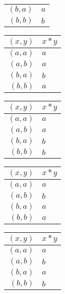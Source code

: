 \begin{enumerate}[label={\Alph*.},font={\bfseries}]
\begin{enumerate}[label={\arabic*},font={\bfseries}]
\begin{minipage}[h]{.25\textwidth}
\begin{tabular}{ r | l }
        $(b,a)$ & $a$ \\
        $(b,b)$ & $b$
      \end{tabular}
    \end{minipage}
    \begin{minipage}[h]{.25\textwidth}
      \begin{tabular}{ r | l }
        $(x,y)$ & $x*y$ \\
        \hline
        $(a,a)$ & $a$ \\
        $(a,b)$ & $a$ \\
        $(b,a)$ & $b$ \\
        $(b,b)$ & $a$
      \end{tabular}
    \end{minipage}
    \begin{minipage}[h]{.25\textwidth}
      \begin{tabular}{ r | l }
        $(x,y)$ & $x*y$ \\
        \hline
        $(a,a)$ & $a$ \\
        $(a,b)$ & $a$ \\
        $(b,a)$ & $b$ \\
        $(b,b)$ & $b$
      \end{tabular}
    \end{minipage}
    \begin{minipage}[h]{.25\textwidth}
      \begin{tabular}{ r | l }
        $(x,y)$ & $x*y$ \\
        \hline
        $(a,a)$ & $a$ \\
        $(a,b)$ & $b$ \\
        $(b,a)$ & $a$ \\
        $(b,b)$ & $a$
      \end{tabular}
    \end{minipage}
    \begin{minipage}[h]{.25\textwidth}
      \begin{tabular}{ r | l }
        $(x,y)$ & $x*y$ \\
        \hline
        $(a,a)$ & $a$ \\
        $(a,b)$ & $b$ \\
        $(b,a)$ & $a$ \\
        $(b,b)$ & $b$
      \end{tabular}
    \end{minipage}

\end{enumerate}
\end{enumerate}
